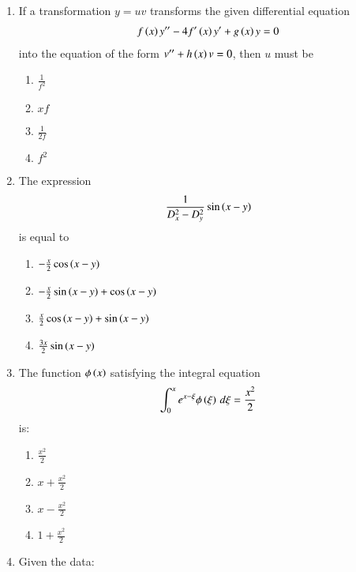 \documentclass[journal]{IEEEtran}
\begin{document}
\begin{enumerate}
\item If a transformation $y = u v$ transforms the given differential equation 
\begin{align*}
f \left(x\right) y^{\prime\prime} - 4 f^\prime \left(x\right) y^\prime + g \left(x\right) y = 0 
\end{align*}
into the equation of the form $v^{\prime\prime} + h \left(x\right) v = 0$, then $u$ must be

\begin{enumerate}
    \item $\frac{1}{f^2}$
    \item $x f$
    \item $\frac{1}{2 f}$
    \item $f^2$
\end{enumerate}

\item The expression 
\begin{align*}
\frac{1}{D_x^2 - D_y^2} \sin \left(x - y\right)
\end{align*}
is equal to

\begin{enumerate}
    \item $-\frac{x}{2} \cos \left(x - y\right)$
    \item $-\frac{x}{2} \sin \left(x - y\right) + \cos \left(x - y\right)$
    \item $\frac{x}{2} \cos \left(x - y\right) + \sin \left(x - y\right)$
    \item $\frac{3x}{2} \sin \left(x - y\right)$
\end{enumerate}

\item The function $\phi \left(x\right)$ satisfying the integral equation
\begin{align*}
\int_0^x e^{x-\xi} \phi \left(\xi\right) \, d\xi = \frac{x^2}{2}
\end{align*}
is:

\begin{enumerate}
    \item $\frac{x^2}{2}$
    \item $x + \frac{x^2}{2}$
    \item $x - \frac{x^2}{2}$
    \item $1 + \frac{x^2}{2}$
\end{enumerate}

\item Given the data:

	\begin{table}[h!]
		\centering
		
	\end{table}


\end{enumerate}
\end{document}
